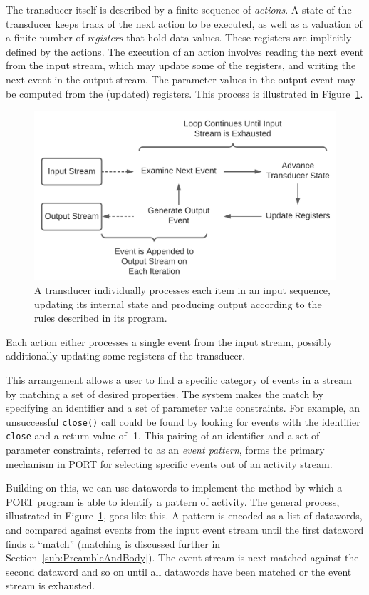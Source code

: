 The transducer itself is described by a finite sequence of \emph{actions}. A state of the transducer keeps track of the next action to be executed, as well as a valuation of a finite number of \emph{registers} that hold data values.
These registers are implicitly defined by the actions.
The execution of an action involves reading the next event from the input stream, which may update some of the registers, and writing the next event in the output stream.
The parameter values in the output event may be computed from the (updated) registers. This process is illustrated in Figure~\ref{fig:Processing}.


\begin{figure}[t]
  \centering
  \includegraphics[scale=.6]{images/processing}
  \caption{A transducer individually processes each item in an input
  sequence, updating its internal state and producing output according
  to the rules described in its program.}
  \label{fig:Processing}
\end{figure}

\iffalse
Each action either processes a single event from the input stream, possibly additionally updating some registers of the transducer.

This arrangement allows a user to find
a specific category of events
in a stream
by matching a set of desired properties.
The system makes the match by specifying
an identifier and a set of parameter value
constraints.  For example, an unsuccessful {\tt close()} call could be
found by looking for events with the identifier {\tt close} and a return
value of -1.  This pairing of an identifier and a set of parameter
constraints, referred to as an \emph{event pattern}, forms the primary mechanism in PORT for
selecting specific events out of an activity stream.

Building on this, we can use datawords to implement the method by which
a PORT program is able to
identify a  pattern of activity.
The general process, illustrated in Figure~\ref{fig:Processing}, goes like
this.  A pattern is encoded as a list of datawords, and compared against
events from the
input event stream until the first dataword
finds a ``match'' (matching is discussed further in
Section~\ref{sub:PreambleAndBody}).  The event stream is next matched
against the
second dataword
and so on until all datawords have been matched or the event stream is
exhausted.


